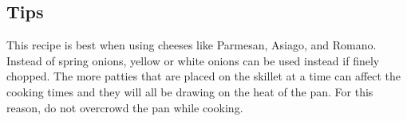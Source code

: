 \subsection*{Tips}
This recipe is best when using cheeses like Parmesan, Asiago, and Romano. Instead of spring onions, yellow or white onions can be used instead if finely chopped. The more patties that are placed on the skillet at a time can affect the cooking times and they will all be drawing on the heat of the pan. For this reason, do not overcrowd the pan while cooking. 